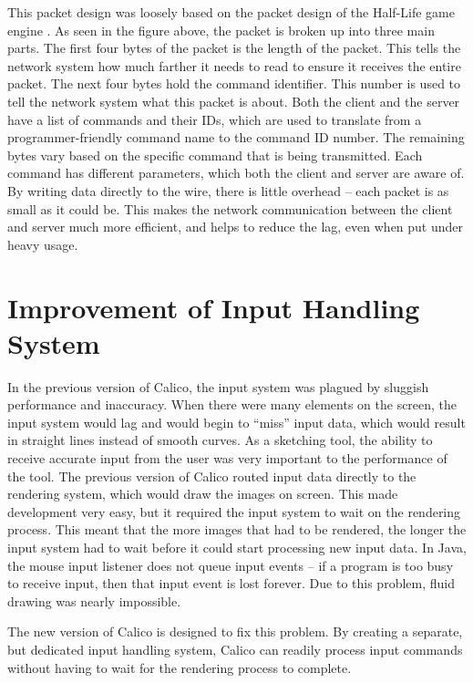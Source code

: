 This packet design was loosely based on the packet design of the Half-Life game engine \cite{rcon}. As seen in the figure above, the packet is broken up into three main parts. The first four bytes of the packet is the length of the packet. This tells the network system how much farther it needs to read to ensure it receives the entire packet. The next four bytes hold the command identifier. This number is used to tell the network system what this packet is about. Both the client and the server have a list of commands and their IDs, which are used to translate from a programmer-friendly command name to the command ID number. The remaining bytes vary based on the specific command that is being transmitted. Each command has different parameters, which both the client and server are aware of. By writing data directly to the wire, there is little overhead -- each packet is as small as it could be. This makes the network communication between the client and server much more efficient, and helps to reduce the lag, even when put under heavy usage.

\section{Improvement of Input Handling System}
In the previous version of Calico, the input system was plagued by sluggish performance and inaccuracy. When there were many elements on the screen, the input system would lag and would begin to ``miss'' input data, which would result in straight lines instead of smooth curves. As a sketching tool, the ability to receive accurate input from the user was very important to the performance of the tool. The previous version of Calico routed input data directly to the rendering system, which would draw the images on screen. This made development very easy, but it required the input system to wait on the rendering process. This meant that the more images that had to be rendered, the longer the input system had to wait before it could start processing new input data. In Java, the mouse input listener does not queue input events -- if a program is too busy to receive input, then that input event is lost forever. Due to this problem, fluid drawing was nearly impossible.   

The new version of Calico is designed to fix this problem. By creating a separate, but dedicated input handling system, Calico can readily process input commands without having to wait for the rendering process to complete.

